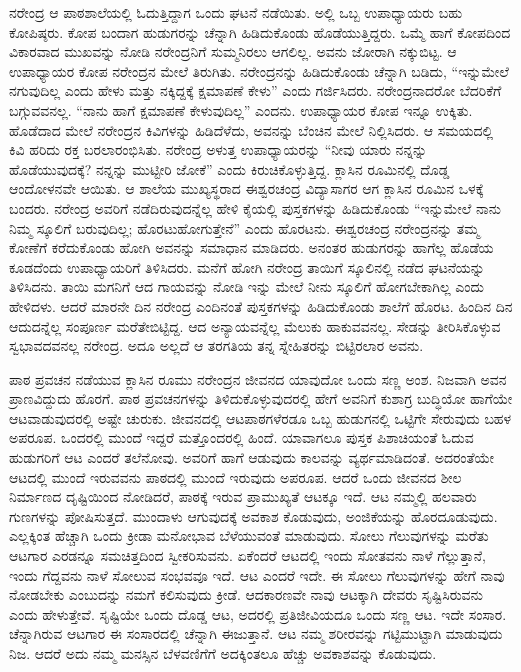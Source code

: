 ನರೇಂದ್ರ ಆ ಪಾಠಶಾಲೆಯಲ್ಲಿ ಓದುತ್ತಿದ್ದಾಗ ಒಂದು ಘಟನೆ ನಡೆಯಿತು. ಅಲ್ಲಿ ಒಬ್ಬ ಉಪಾಧ್ಯಾಯರು ಬಹು ಕೋಪಿಷ್ಠರು. ಕೋಪ ಬಂದಾಗ ಹುಡುಗರನ್ನು ಚೆನ್ನಾಗಿ ಹಿಡಿದುಕೊಂಡು ಹೊಡೆಯುತ್ತಿದ್ದರು. ಒಮ್ಮೆ ಹಾಗೆ ಕೋಪದಿಂದ ವಿಕಾರವಾದ ಮುಖವನ್ನು ನೋಡಿ ನರೇಂದ್ರನಿಗೆ ಸುಮ್ಮನಿರಲು ಆಗಲಿಲ್ಲ. ಅವನು ಜೋರಾಗಿ ನಕ್ಕುಬಿಟ್ಟ. ಆ ಉಪಾಧ್ಯಾಯರ ಕೋಪ ನರೇಂದ್ರನ ಮೇಲೆ ತಿರುಗಿತು. ನರೇಂದ್ರನನ್ನು ಹಿಡಿದುಕೊಂಡು ಚೆನ್ನಾಗಿ ಬಡಿದು, “ಇನ್ನುಮೇಲೆ ನಗುವುದಿಲ್ಲ ಎಂದು ಹೇಳು ಮತ್ತು ನಕ್ಕಿದ್ದಕ್ಕೆ ಕ್ಷಮಾಪಣೆ ಕೇಳು” ಎಂದು ಗರ್ಜಿಸಿದರು. ನರೇಂದ್ರನಾದರೋ ಬೆದರಿಕೆಗೆ ಬಗ್ಗುವವನಲ್ಲ. “ನಾನು ಹಾಗೆ ಕ್ಷಮಾಪಣೆ ಕೇಳುವುದಿಲ್ಲ” ಎಂದನು. ಉಪಾಧ್ಯಾಯರ ಕೋಪ ಇನ್ನೂ ಉಕ್ಕಿತು. ಹೊಡೆದಾದ ಮೇಲೆ ನರೇಂದ್ರನ ಕಿವಿಗಳನ್ನು ಹಿಡಿದೆಳೆದು, ಅವನನ್ನು ಬೆಂಚಿನ ಮೇಲೆ ನಿಲ್ಲಿಸಿದರು. ಆ ಸಮಯದಲ್ಲಿ ಕಿವಿ ಹರಿದು ರಕ್ತ ಬರಲಾರಂಭಿಸಿತು. ನರೇಂದ್ರ ಅಳುತ್ತ ಉಪಾಧ್ಯಾಯರನ್ನು “ನೀವು ಯಾರು ನನ್ನನ್ನು ಹೊಡೆಯುವುದಕ್ಕೆ? ನನ್ನನ್ನು ಮುಟ್ಟೀರಿ ಜೋಕೆ” ಎಂದು ಕಿರುಚಿಕೊಳ್ಳುತ್ತಿದ್ದ. ಕ್ಲಾಸಿನ ರೂಮಿನಲ್ಲಿ ದೊಡ್ಡ ಆಂದೋಳನವೇ ಆಯಿತು. ಆ ಶಾಲೆಯ ಮುಖ್ಯಸ್ಥರಾದ ಈಶ್ವರಚಂದ್ರ ವಿದ್ಯಾಸಾಗರ ಆಗ ಕ್ಲಾಸಿನ ರೂಮಿನ ಒಳಕ್ಕೆ ಬಂದರು. ನರೇಂದ್ರ ಅವರಿಗೆ ನಡೆದಿರುವುದನ್ನೆಲ್ಲ ಹೇಳಿ ಕೈಯಲ್ಲಿ ಪುಸ್ತಕಗಳನ್ನು ಹಿಡಿದುಕೊಂಡು “ಇನ್ನುಮೇಲೆ ನಾನು ನಿಮ್ಮ ಸ್ಕೂಲಿಗೆ ಬರುವುದಿಲ್ಲ; ಹೊರಟುಹೋಗುತ್ತೇನೆ” ಎಂದು ಹೊರಟನು. ಈಶ್ವರಚಂದ್ರ ನರೇಂದ್ರನನ್ನು ತಮ್ಮ ಕೋಣೆಗೆ ಕರೆದುಕೊಂಡು ಹೋಗಿ ಅವನನ್ನು ಸಮಾಧಾನ ಮಾಡಿದರು. ಅನಂತರ ಹುಡುಗರನ್ನು ಹಾಗೆಲ್ಲ ಹೊಡೆಯ ಕೂಡದೆಂದು ಉಪಾಧ್ಯಾಯರಿಗೆ ತಿಳಿಸಿದರು. ಮನೆಗೆ ಹೋಗಿ ನರೇಂದ್ರ ತಾಯಿಗೆ ಸ್ಕೂಲಿನಲ್ಲಿ ನಡೆದ ಘಟನೆಯನ್ನು ತಿಳಿಸಿದನು. ತಾಯಿ ಮಗನಿಗೆ ಆದ ಗಾಯವನ್ನು ನೋಡಿ ಇನ್ನು ಮೇಲೆ ನೀನು ಸ್ಕೂಲಿಗೆ ಹೋಗಬೇಕಾಗಿಲ್ಲ ಎಂದು ಹೇಳಿದಳು. ಆದರೆ ಮಾರನೇ ದಿನ ನರೇಂದ್ರ ಎಂದಿನಂತೆ ಪುಸ್ತಕಗಳನ್ನು ಹಿಡಿದುಕೊಂಡು ಶಾಲೆಗೆ ಹೊರಟ. ಹಿಂದಿನ ದಿನ ಆದುದನ್ನೆಲ್ಲ ಸಂಪೂರ್ಣ ಮರೆತೇಬಿಟ್ಟಿದ್ದ. ಆದ ಅನ್ಯಾಯವನ್ನೆಲ್ಲ ಮೆಲುಕು ಹಾಕುವವನಲ್ಲ. ಸೇಡನ್ನು ತೀರಿಸಿಕೊಳ್ಳುವ ಸ್ವಭಾವದವನಲ್ಲ ನರೇಂದ್ರ. ಅದೂ ಅಲ್ಲದೆ ಆ ತರಗತಿಯ ತನ್ನ ಸ್ನೇಹಿತರನ್ನು ಬಿಟ್ಟಿರಲಾರ ಅವನು.

ಪಾಠ ಪ್ರವಚನ ನಡೆಯುವ ಕ್ಲಾಸಿನ ರೂಮು ನರೇಂದ್ರನ ಜೀವನದ ಯಾವುದೋ ಒಂದು ಸಣ್ಣ ಅಂಶ. ನಿಜವಾಗಿ ಅವನ ಪ್ರಾಣವಿದ್ದುದು ಹೊರಗೆ. ಪಾಠ ಪ್ರವಚನಗಳನ್ನು ತಿಳಿದುಕೊಳ್ಳುವುದರಲ್ಲಿ ಹೇಗೆ ಅವನಿಗೆ ಕುಶಾಗ್ರ ಬುದ್ಧಿಯೋ ಹಾಗೆಯೇ ಆಟವಾಡುವುದರಲ್ಲಿ ಅಷ್ಟೇ ಚುರುಕು. ಜೀವನದಲ್ಲಿ ಆಟಪಾಠಗಳೆರಡೂ ಒಬ್ಬ ಹುಡುಗನಲ್ಲಿ ಒಟ್ಟಿಗೇ ಸೇರುವುದು ಬಹಳ ಅಪರೂಪ. ಒಂದರಲ್ಲಿ ಮುಂದೆ ಇದ್ದರೆ ಮತ್ತೊಂದರಲ್ಲಿ ಹಿಂದೆ. ಯಾವಾಗಲೂ ಪುಸ್ತಕ ಪಿಶಾಚಿಯಂತೆ ಓದುವ ಹುಡುಗರಿಗೆ ಆಟ ಎಂದರೆ ತಲೆನೋವು. ಅವರಿಗೆ ಹಾಗೆ ಆಡುವುದು ಕಾಲವನ್ನು ವ್ಯರ್ಥಮಾಡಿದಂತೆ. ಅದರಂತೆಯೇ ಆಟದಲ್ಲಿ ಮುಂದೆ ಇರುವವನು ಪಾಠದಲ್ಲಿ ಮುಂದೆ ಇರುವುದು ಅಪರೂಪ. ಆದರೆ ಒಂದು ಜೀವನದ ಶೀಲ ನಿರ್ಮಾಣದ ದೃಷ್ಟಿಯಿಂದ ನೋಡಿದರೆ, ಪಾಠಕ್ಕೆ ಇರುವ ಪ್ರಾಮುಖ್ಯತೆ ಆಟಕ್ಕೂ ಇದೆ. ಆಟ ನಮ್ಮಲ್ಲಿ ಹಲವಾರು ಗುಣಗಳನ್ನು ಪೋಷಿಸುತ್ತದೆ. ಮುಂದಾಳು ಆಗುವುದಕ್ಕೆ ಅವಕಾಶ ಕೊಡುವುದು, ಅಂಜಿಕೆಯನ್ನು ಹೊರದೂಡುವುದು. ಎಲ್ಲಕ್ಕಿಂತ ಹೆಚ್ಚಾಗಿ ಒಂದು ಕ್ರೀಡಾ ಮನೋಭಾವ ಬೆಳೆಯುವಂತೆ ಮಾಡುವುದು. ಸೋಲು ಗೆಲುವುಗಳನ್ನು ಮರೆತು ಆಟಗಾರ ಎರಡನ್ನೂ ಸಮಚಿತ್ತದಿಂದ ಸ್ವೀಕರಿಸುವನು. ಏಕೆಂದರೆ ಆಟದಲ್ಲಿ ಇಂದು ಸೋತವನು ನಾಳೆ ಗೆಲ್ಲುತ್ತಾನೆ, ಇಂದು ಗೆದ್ದವನು ನಾಳೆ ಸೋಲುವ ಸಂಭವವೂ ಇದೆ. ಆಟ ಎಂದರೆ ಇದೇ. ಈ ಸೋಲು ಗೆಲುವುಗಳನ್ನು ಹೇಗೆ ನಾವು ನೋಡಬೇಕು ಎಂಬುದನ್ನು ನಮಗೆ ಕಲಿಸುವುದು ಕ್ರೀಡೆ. ಆದಕಾರಣವೇ ನಾವು ಆಟಕ್ಕಾಗಿ ದೇವರು ಸೃಷ್ಟಿಸಿರುವನು ಎಂದು ಹೇಳುತ್ತೇವೆ. ಸೃಷ್ಟಿಯೇ ಒಂದು ದೊಡ್ಡ ಆಟ, ಅದರಲ್ಲಿ ಪ್ರತಿಜೀವಿಯದೂ ಒಂದು ಸಣ್ಣ ಆಟ. ಇದೇ ಸಂಸಾರ. ಚೆನ್ನಾಗಿರುವ ಆಟಗಾರ ಈ ಸಂಸಾರದಲ್ಲಿ ಚೆನ್ನಾಗಿ ಈಜುತ್ತಾನೆ. ಆಟ ನಮ್ಮ ಶರೀರವನ್ನು ಗಟ್ಟಿಮುಟ್ಟಾಗಿ ಮಾಡುವುದು ನಿಜ. ಆದರೆ ಅದು ನಮ್ಮ ಮನಸ್ಸಿನ ಬೆಳವಣಿಗೆಗೆ ಅದಕ್ಕಿಂತಲೂ ಹೆಚ್ಚು ಅವಕಾಶವನ್ನು ಕೊಡುವುದು.

